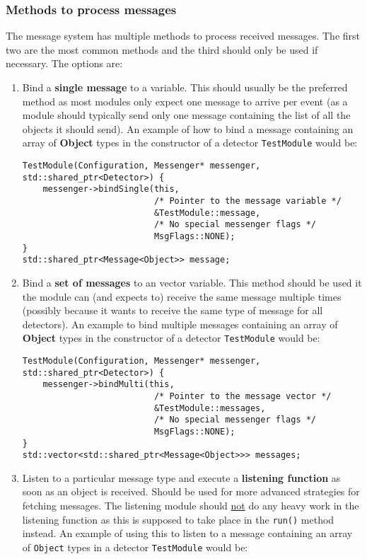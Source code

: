 \subsubsection{Methods to process messages}
The message system has multiple methods to process received messages. The first two are the most common methods and the third should only be used if necessary. The options are:
\begin{enumerate}
\item Bind a \textbf{single message} to a variable. This should usually be the preferred method as most modules only expect one message to arrive per event (as a module should typically send only one message containing the list of all the objects it should send). An example of how to bind a message containing an array of \textbf{Object} types in the constructor of a detector \texttt{TestModule} would be:
\begin{verbatim}
TestModule(Configuration, Messenger* messenger, std::shared_ptr<Detector>) {
    messenger->bindSingle(this, 
                          /* Pointer to the message variable */
                          &TestModule::message,
                          /* No special messenger flags */
                          MsgFlags::NONE);
}
std::shared_ptr<Message<Object>> message;
\end{verbatim}
\item Bind a \textbf{set of messages} to an vector variable. This method should be used it the module can (and expects to) receive the same message multiple times (possibly because it wants to receive the same type of message for all detectors). An example to bind multiple messages containing an array of \textbf{Object} types in the constructor of a detector \texttt{TestModule} would be:
\begin{verbatim}
TestModule(Configuration, Messenger* messenger, std::shared_ptr<Detector>) {
    messenger->bindMulti(this,
                          /* Pointer to the message vector */
                          &TestModule::messages,
                          /* No special messenger flags */
                          MsgFlags::NONE);
}
std::vector<std::shared_ptr<Message<Object>>> messages;
\end{verbatim}
\item Listen to a particular message type and execute a \textbf{listening function} as soon as an object is received. Should be used for more advanced strategies for fetching messages. The listening module should \underline{not} do any heavy work in the listening function as this is supposed to take place in the \texttt{run()} method instead. An example of using this to listen to a message containing an array of \texttt{Object} types in a detector \texttt{TestModule} would be:

\end{enumerate}
